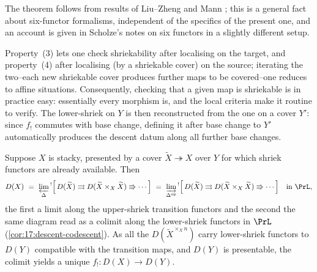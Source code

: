 The theorem follows from results of Liu--Zheng \cite{liu2024enhancedoperationsbasechange}
and Mann \cite{mann2022padic6functorformalismrigidanalytic}; this is a general
fact about six-functor formalisms, independent of the specifics of the present
one, and an account is given in Scholze's notes on six functors
\cite{scholze2023six} in a slightly different setup.

\begin{remark}
\label{rmk:21:localise}
Property~(3) lets one check shriekability after localising on the target, and
property~(4) after localising (by a shriekable cover) on the source; iterating
the two--each new shriekable cover produces further maps to be covered--one
reduces to affine situations. Consequently, checking that a given map is
shriekable is in practice easy: essentially every morphism is, and the local
criteria make it routine to verify. The lower-shriek on $Y$ is then reconstructed
from the one on a cover $Y'$: since $f_!$ commutes with base change, defining it
after base change to $Y'$ automatically produces the descent datum along all
further base changes.
\end{remark}

\begin{example}
\label{ex:21:reconstruct-fshriek}
Suppose $X$ is stacky, presented by a cover $\widetilde X\twoheadrightarrow X$
over $Y$ for which shriek functors are already available. Then
\begin{equation*}
D(X)\ =\ \varprojlim_{\Delta}{}^{!}\Bigl[\,D(\widetilde X)\rightrightarrows
D(\widetilde X\times_X\widetilde X)\Rrightarrow\cdots\Bigr]\ =\
\varinjlim_{\Delta^{\mathrm{op}}}{}^{!}\Bigl[\,D(\widetilde X)\rightrightarrows
D(\widetilde X\times_X\widetilde X)\Rrightarrow\cdots\Bigr]\quad\text{in }\PrL,
\end{equation*}
the first a limit along the upper-shriek transition functors and the second the
same diagram read as a colimit along the lower-shriek functors in $\PrL$
(\cref{cor:17:descent-codescent}). As all the $D(\widetilde X^{\times_X n})$
carry lower-shriek functors to $D(Y)$ compatible with the transition maps, and
$D(Y)$ is presentable, the colimit yields a unique $f_!\colon D(X)\to D(Y)$.
\end{example}

